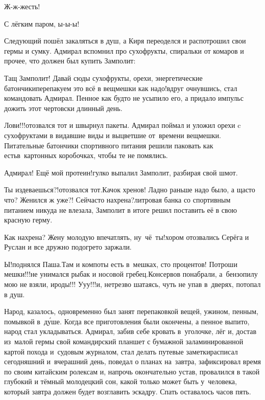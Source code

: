 \diagdash Ж-ж-жесть! 

\diagdash С лёгким паром, ы-ы-ы!

Следующий пошёл закаляться в душ, а Киря переоделся и распотрошил свои гермы и сумку. Адмирал вспомнил про сухофрукты, спиральки от комаров и прочее, что должен был купить Замполит:

\diagdash Тащ Замполит! Давай сюды сухофрукты, орехи, энергетические батончики\mdash перепакуем это всё в вещмешки как надо!\mdash вдруг очнувшись, стал командовать Адмирал. Пенное как будто не усыпило его, а придало импульс дожить этот чертовски длинный день. 

\diagdash Лови!!!\mdash отозвался тот и швырнул пакеты. Адмирал поймал и уложил орехи c сухофруктами в видавшие виды и выцветшие от~времени вещмешки. Питательные батончики спортивного питания решили паковать как есть\mdash в~картонных коробочках, чтобы те не помялись.

\diagdash Адмирал! Ещё мой протеин!\mdash гулко выпалил Замполит, разбирая свой шмот.

\diagdash Ты издеваешься?!\mdash отозвался тот.\mdash Качок хренов! Ладно раньше надо было, а щас\sdash то что? Женился ж уже?! Сейчас\sdash то нахрена?\sdash литровая банка со спортивным питанием никуда не влезала, Замполит в итоге решил поставить её в свою красную герму.

\diagdash Как нахрена? Жену молодую впечатлять, ну~чё~ты!\mdash хором отозвались Серёга и Руслан и все дружно подогрето заржали.

\diagdash Ы!\mdash поднялся Паша.\mdash Там и компоты есть в~мешках, сто процентов! Потроши мешки!!!\mdash не унимался рыбак и носовой гребец.\mdash Консервов понабрали, а~бензопилу мою не взяли, ироды!!! У\sdash у\sdash у!!!\mdash и, нетрезво шатаясь, чуть не упав в~дверях, потопал в душ.

Народ, казалось, одновременно был занят перепаковкой вещей, ужином, пенным, помывкой в~д\'{у}ше. Когда все приготовления были окончены, а пенное выпито, народ стал укладываться. Адмирал, забив себе кровать в~уголочке, лёг и, достав из~малой гермы свой командирский планшет с бумажной заламинированной картой похода и~судовым журналом, стал делать путевые заметки\mdash расписал сегодняшний и~вчерашний день, поведал о планах на~завтра, зафиксировал время по своим китайским ролексам и, напрочь окончательно устав, провалился в такой глубокий и тёмный молодецкий сон, какой только может быть у~человека, который завтра должен будет возглавить эскадру. Спать оставалось часов пять.

\begin{center}
\end{center}

 






